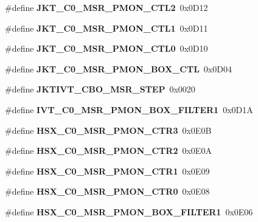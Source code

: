 \begin{DoxyCompactItemize}
\item 
\#define {\bfseries J\+K\+T\+\_\+\+C0\+\_\+\+M\+S\+R\+\_\+\+P\+M\+O\+N\+\_\+\+C\+T\+L2}~0x0\+D12\label{types_8h_a82ba9dd7fcf01994e85d558b4e481287}

\item 
\#define {\bfseries J\+K\+T\+\_\+\+C0\+\_\+\+M\+S\+R\+\_\+\+P\+M\+O\+N\+\_\+\+C\+T\+L1}~0x0\+D11\label{types_8h_a398a8a31386e9fc47fed63f6bffc2772}

\item 
\#define {\bfseries J\+K\+T\+\_\+\+C0\+\_\+\+M\+S\+R\+\_\+\+P\+M\+O\+N\+\_\+\+C\+T\+L0}~0x0\+D10\label{types_8h_a030002252aacc254548ada78d2c65197}

\item 
\#define {\bfseries J\+K\+T\+\_\+\+C0\+\_\+\+M\+S\+R\+\_\+\+P\+M\+O\+N\+\_\+\+B\+O\+X\+\_\+\+C\+T\+L}~0x0\+D04\label{types_8h_a26683ece9ba36b917bb745038f1193d3}

\item 
\#define {\bfseries J\+K\+T\+I\+V\+T\+\_\+\+C\+B\+O\+\_\+\+M\+S\+R\+\_\+\+S\+T\+E\+P}~0x0020\label{types_8h_a069253dac5f3da55d4814e91b888f67f}

\item 
\#define {\bfseries I\+V\+T\+\_\+\+C0\+\_\+\+M\+S\+R\+\_\+\+P\+M\+O\+N\+\_\+\+B\+O\+X\+\_\+\+F\+I\+L\+T\+E\+R1}~0x0\+D1\+A\label{types_8h_af8b5eb92ad5d6fb3f03130c201c60860}

\item 
\#define {\bfseries H\+S\+X\+\_\+\+C0\+\_\+\+M\+S\+R\+\_\+\+P\+M\+O\+N\+\_\+\+C\+T\+R3}~0x0\+E0\+B\label{types_8h_afc5237039c59a0783dbc709ebecd69dc}

\item 
\#define {\bfseries H\+S\+X\+\_\+\+C0\+\_\+\+M\+S\+R\+\_\+\+P\+M\+O\+N\+\_\+\+C\+T\+R2}~0x0\+E0\+A\label{types_8h_a3ad5497dcf2c7d89d504ef40bb8366e3}

\item 
\#define {\bfseries H\+S\+X\+\_\+\+C0\+\_\+\+M\+S\+R\+\_\+\+P\+M\+O\+N\+\_\+\+C\+T\+R1}~0x0\+E09\label{types_8h_a7fb1b10f629451ddd7afb4349f4d3ca8}

\item 
\#define {\bfseries H\+S\+X\+\_\+\+C0\+\_\+\+M\+S\+R\+\_\+\+P\+M\+O\+N\+\_\+\+C\+T\+R0}~0x0\+E08\label{types_8h_a039985ea2576189280f6699430c7b868}

\item 
\#define {\bfseries H\+S\+X\+\_\+\+C0\+\_\+\+M\+S\+R\+\_\+\+P\+M\+O\+N\+\_\+\+B\+O\+X\+\_\+\+F\+I\+L\+T\+E\+R1}~0x0\+E06\label{types_8h_a41a862718755cf090930ea2e70c4bc73}


\end{DoxyCompactItemize}
